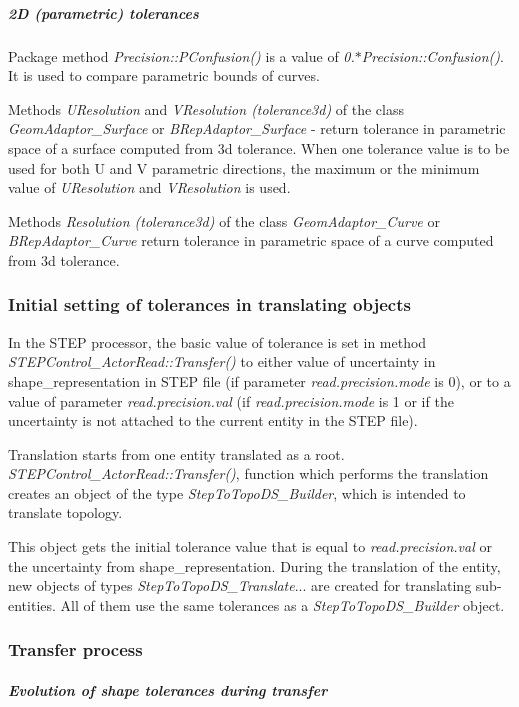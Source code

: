 \subparagraph*{2D (parametric) tolerances}


\begin{DoxyItemize}
\item Package method {\itshape Precision::P\+Confusion()} is a value of {\itshape 0.$\ast$\+Precision::Confusion()}. It is used to compare parametric bounds of curves.
\item Methods {\itshape U\+Resolution} and {\itshape V\+Resolution (tolerance3d)} of the class {\itshape Geom\+Adaptor\+\_\+\+Surface} or {\itshape B\+Rep\+Adaptor\+\_\+\+Surface} -\/ return tolerance in parametric space of a surface computed from 3d tolerance. When one tolerance value is to be used for both U and V parametric directions, the maximum or the minimum value of {\itshape U\+Resolution} and {\itshape V\+Resolution} is used.
\item Methods {\itshape Resolution (tolerance3d)} of the class {\itshape Geom\+Adaptor\+\_\+\+Curve} or {\itshape B\+Rep\+Adaptor\+\_\+\+Curve} return tolerance in parametric space of a curve computed from 3d tolerance.
\end{DoxyItemize}\hypertarget{occt_user_guides__step_occt_step_2_5_2}{}\subsubsection{Initial setting of tolerances in translating objects}\label{occt_user_guides__step_occt_step_2_5_2}
In the S\+T\+EP processor, the basic value of tolerance is set in method {\itshape S\+T\+E\+P\+Control\+\_\+\+Actor\+Read\+::\+Transfer()} to either value of uncertainty in shape\+\_\+representation in S\+T\+EP file (if parameter {\itshape read.\+precision.\+mode} is 0), or to a value of parameter {\itshape read.\+precision.\+val} (if {\itshape read.\+precision.\+mode} is 1 or if the uncertainty is not attached to the current entity in the S\+T\+EP file).

Translation starts from one entity translated as a root. {\itshape S\+T\+E\+P\+Control\+\_\+\+Actor\+Read\+::\+Transfer()}, function which performs the translation creates an object of the type {\itshape Step\+To\+Topo\+D\+S\+\_\+\+Builder}, which is intended to translate topology.

This object gets the initial tolerance value that is equal to {\itshape read.\+precision.\+val} or the uncertainty from shape\+\_\+representation. During the translation of the entity, new objects of types {\itshape Step\+To\+Topo\+D\+S\+\_\+\+Translate}... are created for translating sub-\/entities. All of them use the same tolerances as a {\itshape Step\+To\+Topo\+D\+S\+\_\+\+Builder} object.\hypertarget{occt_user_guides__step_occt_step_2_5_3}{}\subsubsection{Transfer process}\label{occt_user_guides__step_occt_step_2_5_3}
\subparagraph*{Evolution of shape tolerances during transfer}


